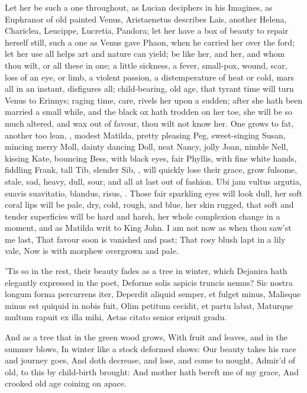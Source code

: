 {Let her be such a one throughout, as Lucian deciphers in his Imagines,
as Euphranor of old painted Venus, Aristaenetus describes Lais, another
Helena, Chariclea, Leucippe, Lucretia, Pandora; let her have a box of
beauty to repair herself still, such a one as Venus gave Phaon, when he
carried her over the ford; let her use all helps art and nature can
yield; be like her, and her, and whom thou wilt, or all these in one; a
little sickness, a fever, small-pox, wound, scar, loss of an eye, or
limb, a violent passion, a distemperature of heat or cold, mars all in
an instant, disfigures all; child-bearing, old age, that tyrant time
will turn Venus to Erinnys; raging time, care, rivels her upon a
sudden; after she hath been married a small while, and the black ox
hath trodden on her toe, she will be so much altered, and wax out of
favour, thou wilt not know her. One grows to fat, another too lean,
\etc{}, modest Matilda, pretty pleasing Peg, sweet-singing Susan, mincing
merry Moll, dainty dancing Doll, neat Nancy, jolly Joan, nimble Nell,
kissing Kate, bouncing Bess, with black eyes, fair Phyllis, with fine
white hands, fiddling Frank, tall Tib, slender Sib, \etc{}, will quickly
lose their grace, grow fulsome, stale, sad, heavy, dull, sour, and all
at last out of fashion. Ubi jam vultus argutia, suavis suavitatio,
blandus, risus, \etc{}. Those fair sparkling eyes will look dull, her soft
coral lips will be pale, dry, cold, rough, and blue, her skin rugged,
that soft and tender superficies will be hard and harsh, her whole
complexion change in a moment, and as Matilda writ to King John.
I am not now as when thou saw'st me last,
That favour soon is vanished and past;
That rosy blush lapt in a lily vale,
Now is with morphew overgrown and pale.

'Tis so in the rest, their beauty fades as a tree in winter, which
Dejanira hath elegantly expressed in the poet,
Deforme solis aspicis truncis nemus?
Sic nostra longum forma percurrens iter,
Deperdit aliquid semper, et fulget minus,
Malisque minus est quiquid in nobis fuit,
Olim petitum cecidit, et partu labat,
Maturque multum rapuit ex illa mihi,
Aetas citato senior eripuit gradu.

And as a tree that in the green wood grows,
With fruit and leaves, and in the summer blows,
In winter like a stock deformed shows:
Our beauty takes his race and journey goes,
And doth decrease, and lose, and come to nought,
Admir'd of old, to this by child-birth brought:
And mother hath bereft me of my grace,
And crooked old age coining on apace.

}
